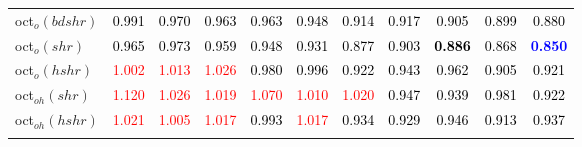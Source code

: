 \begin{tabular}[t]{l|>{}cccc>{}c|ccccc}
oct$_o(bdshr)$ & \textcolor{black}{0.991} & \textcolor{black}{0.970} & \textcolor{black}{0.963} & \textcolor{black}{0.963} & \textcolor{black}{0.948} & \textcolor{black}{0.914} & \textcolor{black}{0.917} & \textcolor{black}{0.905} & \textcolor{black}{0.899} & \textcolor{black}{0.880}\\
oct$_o(shr)$ & \textcolor{black}{0.965} & \textcolor{black}{0.973} & \textcolor{black}{0.959} & \textcolor{black}{0.948} & \textcolor{black}{0.931} & \textcolor{black}{0.877} & \textcolor{black}{0.903} & \textcolor{black}{\textbf{0.886}} & \textcolor{black}{0.868} & \textcolor{blue}{\textbf{0.850}}\\
oct$_o(hshr)$ & \textcolor{red}{1.002} & \textcolor{red}{1.013} & \textcolor{red}{1.026} & \textcolor{black}{0.980} & \textcolor{black}{0.996} & \textcolor{black}{0.922} & \textcolor{black}{0.943} & \textcolor{black}{0.962} & \textcolor{black}{0.905} & \textcolor{black}{0.921}\\
oct$_{oh}(shr)$ & \textcolor{red}{1.120} & \textcolor{red}{1.026} & \textcolor{red}{1.019} & \textcolor{red}{1.070} & \textcolor{red}{1.010} & \textcolor{red}{1.020} & \textcolor{black}{0.947} & \textcolor{black}{0.939} & \textcolor{black}{0.981} & \textcolor{black}{0.922}\\
oct$_{oh}(hshr)$ & \textcolor{red}{1.021} & \textcolor{red}{1.005} & \textcolor{red}{1.017} & \textcolor{black}{0.993} & \textcolor{red}{1.017} & \textcolor{black}{0.934} & \textcolor{black}{0.929} & \textcolor{black}{0.946} & \textcolor{black}{0.913} & \textcolor{black}{0.937}\\
\bottomrule
{}\\
\end{tabular}

